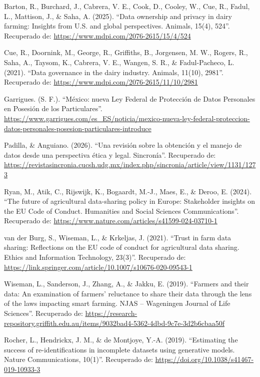 \begin{enumerate}[label={[\arabic*]}]
  \item Barton, R., Burchard, J., Cabrera, V. E., Cook, D., Cooley, W., Cue, R., Fadul, L., Mattison, J., \& Saha, A. (2025). “Data ownership and privacy in dairy farming: Insights from U.S. and global perspectives. Animals, 15(4), 524”. Recuperado de: \url{https://www.mdpi.com/2076-2615/15/4/524}
  \item Cue, R., Doornink, M., George, R., Griffiths, B., Jorgensen, M. W., Rogers, R., Saha, A., Taysom, K., Cabrera, V. E., Wangen, S. R., \& Fadul-Pacheco, L. (2021). “Data governance in the dairy industry. Animals, 11(10), 2981”. Recuperado de: \url{https://www.mdpi.com/2076-2615/11/10/2981}
  \item Garrigues. (S. F.). “México: nueva Ley Federal de Protección de Datos Personales en Posesión de los Particulares”. \url{https://www.garrigues.com/es_ES/noticia/mexico-nueva-ley-federal-proteccion-datos-personales-posesion-particulares-introduce}
  \item Padilla, \& Anguiano. (2026). “Una revisión sobre la obtención y el manejo de datos desde una perspectiva ética y legal. Sincronía”. Recuperado de: \url{https://revistasincronia.cucsh.udg.mx/index.php/sincronia/article/view/1131/1273}
  \item Ryan, M., Atik, C., Rijswijk, K., Bogaardt, M.-J., Maes, E., \& Deroo, E. (2024). “The future of agricultural data-sharing policy in Europe: Stakeholder insights on the EU Code of Conduct. Humanities and Social Sciences Communications”. Recuperado de: \url{https://www.nature.com/articles/s41599-024-03710-1}
  \item van der Burg, S., Wiseman, L., \& Krkeljas, J. (2021). “Trust in farm data sharing: Reflections on the EU code of conduct for agricultural data sharing. Ethics and Information Technology, 23(3)”. Recuperado de: \url{https://link.springer.com/article/10.1007/s10676-020-09543-1}
  \item Wiseman, L., Sanderson, J., Zhang, A., \& Jakku, E. (2019). “Farmers and their data: An examination of farmers’ reluctance to share their data through the lens of the laws impacting smart farming. NJAS – Wageningen Journal of Life Sciences”. Recuperado de: \url{https://research-repository.griffith.edu.au/items/9032bad4-5362-4dbd-9c7e-3d2b6cbaa50f}
  \item Rocher, L., Hendrickx, J. M., \& de Montjoye, Y.-A. (2019). “Estimating the success of re-identifications in incomplete datasets using generative models. Nature Communications, 10(1)”. Recuperado de: \url{https://doi.org/10.1038/s41467-019-10933-3}

\end{enumerate}
